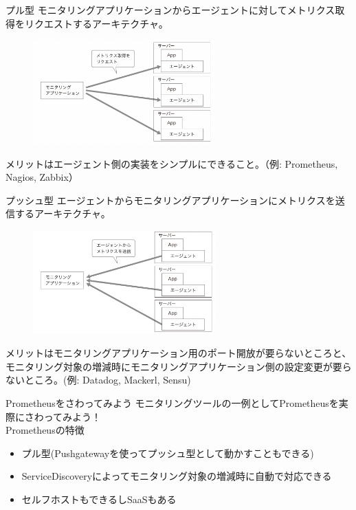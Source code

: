 \documentclass{beamer}
\begin{document}
\begin{frame}{プル型}
  モニタリングアプリケーションからエージェントに対してメトリクス取得をリクエストするアーキテクチャ。
  \begin{figure}
    \centering
    \includegraphics[clip, keepaspectratio, width=70mm]{./fig/pull.png}
  \end{figure}
  メリットはエージェント側の実装をシンプルにできること。（例: Prometheus, Nagios, Zabbix）
\end{frame}

\begin{frame}{プッシュ型}
  エージェントからモニタリングアプリケーションにメトリクスを送信するアーキテクチャ。
  \begin{figure}
    \centering
    \includegraphics[clip, keepaspectratio, width=70mm]{./fig/push.png}
  \end{figure}
  メリットはモニタリングアプリケーション用のポート開放が要らないところと、モニタリング対象の増減時にモニタリングアプリケーション側の設定変更が要らないところ。(例: Datadog, Mackerl, Sensu)
\end{frame}

\begin{frame}{Prometheusをさわってみよう}
  モニタリングツールの一例としてPrometheusを実際にさわってみよう！\\
  Prometheusの特徴
  \begin{itemize}
    \item プル型(Pushgatewayを使ってプッシュ型として動かすこともできる)
    \item ServiceDiscoveryによってモニタリング対象の増減時に自動で対応できる
    \item セルフホストもできるしSaaSもある
  \end{itemize}
\end{frame}
\end{document}
